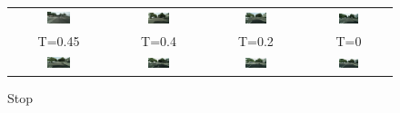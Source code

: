 \begin{figure}
\begin{tabular}{cccc}
        \includegraphics[width=0.25\textwidth]{Chapters/figures/experiments/seg_stop/0_0.6499999999999999_cond_sample.png} & \includegraphics[width=0.25\textwidth]{Chapters/figures/experiments/seg_stop/0_0.6_cond_sample.png} & \includegraphics[width=0.25\textwidth]{Chapters/figures/experiments/seg_stop/0_0.55_cond_sample.png} & \includegraphics[width=0.25\textwidth]{Chapters/figures/experiments/seg_stop/0_0.5_cond_sample.png}\\
        T=0.45 & T=0.4 & T=0.2 & T=0\\
         \includegraphics[width=0.25\textwidth]{Chapters/figures/experiments/seg_stop/0_0.44999999999999996_cond_sample.png} & \includegraphics[width=0.25\textwidth]{Chapters/figures/experiments/seg_stop/0_0.3999999999999999_cond_sample.png} & \includegraphics[width=0.25\textwidth]{Chapters/figures/experiments/seg_stop/0_0.19999999999999996_cond_sample.png}& \includegraphics[width=0.25\textwidth]{Chapters/figures/experiments/seg_stop/0_0.0_cond_sample.png} 
    \end{tabular}
    \caption{Stop}
\end{figure}

